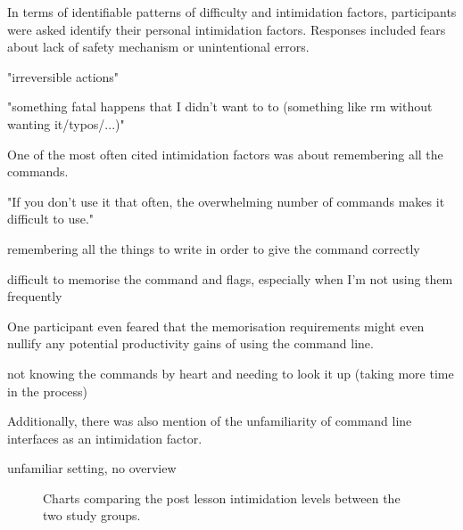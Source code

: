 In terms of identifiable patterns of difficulty and intimidation factors,
participants were asked identify their personal intimidation factors. Responses
included fears about lack of safety mechanism or unintentional errors.

\begin{quotes}
    "irreversible actions"
\end{quotes}

\begin{quotes}
"something fatal happens that I didn't want to to (something like rm without wanting it/typos/...)"
\end{quotes}

One of the most often cited intimidation factors was about remembering all the commands. 
\begin{quotes}
"If you don't use it that often, the overwhelming number of commands makes it difficult to use."
\end{quotes}

\begin{quotes}
remembering all the things to write in order to give the command correctly
\end{quotes}

\begin{quotes}
difficult to memorise the command and flags, especially when I'm not using them frequently
\end{quotes}

One participant even feared that the memorisation requirements might even
nullify any potential productivity gains of using the command line.

\begin{quotes}
not knowing the commands by heart and needing to look it up (taking more time in the
process)
\end{quotes}

Additionally, there was also mention of the unfamiliarity of command line
interfaces as an intimidation factor.

\begin{quotes}
unfamiliar setting, no overview
\end{quotes}


\begin{figure}[htbp]
	\centering
	\scalebox{0.67}{}
	\caption{Charts comparing the post lesson intimidation levels between the two study groups.}
	\label{fig:confidence}
\end{figure}
\clearpage

